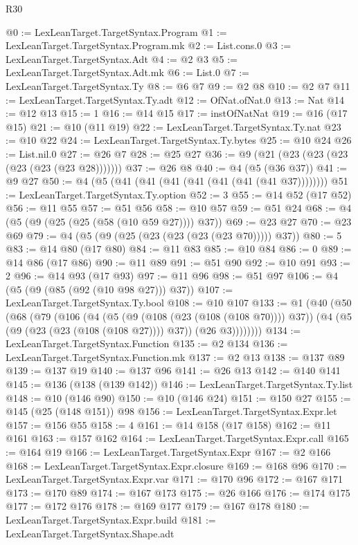 \begin{lexlean}{R30}
\begin{coremodule}
@0 := LexLeanTarget.TargetSyntax.Program
@1 := LexLeanTarget.TargetSyntax.Program.mk
@2 := List.cons.{0}
@3 := LexLeanTarget.TargetSyntax.Adt
@4 := @2 @3
@5 := LexLeanTarget.TargetSyntax.Adt.mk
@6 := List.{0}
@7 := LexLeanTarget.TargetSyntax.Ty
@8 := @6 @7
@9 := @2 @8
@10 := @2 @7
@11 := LexLeanTarget.TargetSyntax.Ty.adt
@12 := OfNat.ofNat.{0}
@13 := Nat
@14 := @12 @13
@15 := 1
@16 := @14 @15
@17 := instOfNatNat
@19 := @16 (@17 @15)
@21 := @10 (@11 @19)
@22 := LexLeanTarget.TargetSyntax.Ty.nat
@23 := @10 @22
@24 := LexLeanTarget.TargetSyntax.Ty.bytes
@25 := @10 @24
@26 := List.nil.{0}
@27 := @26 @7
@28 := @25 @27
@36 := @9 (@21 (@23 (@23 (@23 (@23 (@23 (@23 @28)))))))
@37 := @26 @8
@40 := @4 (@5 (@36 @37))
@41 := @9 @27
@50 := @4 (@5 (@41 (@41 (@41 (@41 (@41 (@41 (@41 @37))))))))
@51 := LexLeanTarget.TargetSyntax.Ty.option
@52 := 3
@55 := @14 @52 (@17 @52)
@56 := @11 @55
@57 := @51 @56
@58 := @10 @57
@59 := @51 @24
@68 := @4 (@5 (@9 (@25 (@25 (@58 (@10 @59 @27)))) @37))
@69 := @23 @27
@70 := @23 @69
@79 := @4 (@5 (@9 (@25 (@23 (@23 (@23 (@23 @70))))) @37))
@80 := 5
@83 := @14 @80 (@17 @80)
@84 := @11 @83
@85 := @10 @84
@86 := 0
@89 := @14 @86 (@17 @86)
@90 := @11 @89
@91 := @51 @90
@92 := @10 @91
@93 := 2
@96 := @14 @93 (@17 @93)
@97 := @11 @96
@98 := @51 @97
@106 := @4 (@5 (@9 (@85 (@92 (@10 @98 @27))) @37))
@107 := LexLeanTarget.TargetSyntax.Ty.bool
@108 := @10 @107
@133 := @1
    (@40
      (@50
        (@68
          (@79
            (@106
              (@4
                (@5 (@9 (@108 (@23 (@108 (@108 @70)))) @37))
                (@4 (@5 (@9 (@23 (@23 (@108 (@108 @27)))) @37)) (@26 @3))))))))
@134 := LexLeanTarget.TargetSyntax.Function
@135 := @2 @134
@136 := LexLeanTarget.TargetSyntax.Function.mk
@137 := @2 @13
@138 := @137 @89
@139 := @137 @19
@140 := @137 @96
@141 := @26 @13
@142 := @140 @141
@145 := @136 (@138 (@139 @142))
@146 := LexLeanTarget.TargetSyntax.Ty.list
@148 := @10 (@146 @90)
@150 := @10 (@146 @24)
@151 := @150 @27
@155 := @145 (@25 (@148 @151)) @98
@156 := LexLeanTarget.TargetSyntax.Expr.let
@157 := @156 @55
@158 := 4
@161 := @14 @158 (@17 @158)
@162 := @11 @161
@163 := @157 @162
@164 := LexLeanTarget.TargetSyntax.Expr.call
@165 := @164 @19
@166 := LexLeanTarget.TargetSyntax.Expr
@167 := @2 @166
@168 := LexLeanTarget.TargetSyntax.Expr.closure
@169 := @168 @96
@170 := LexLeanTarget.TargetSyntax.Expr.var
@171 := @170 @96
@172 := @167 @171
@173 := @170 @89
@174 := @167 @173
@175 := @26 @166
@176 := @174 @175
@177 := @172 @176
@178 := @169 @177
@179 := @167 @178
@180 := LexLeanTarget.TargetSyntax.Expr.build
@181 := LexLeanTarget.TargetSyntax.Shape.adt

\end{coremodule}
\end{lexlean}
